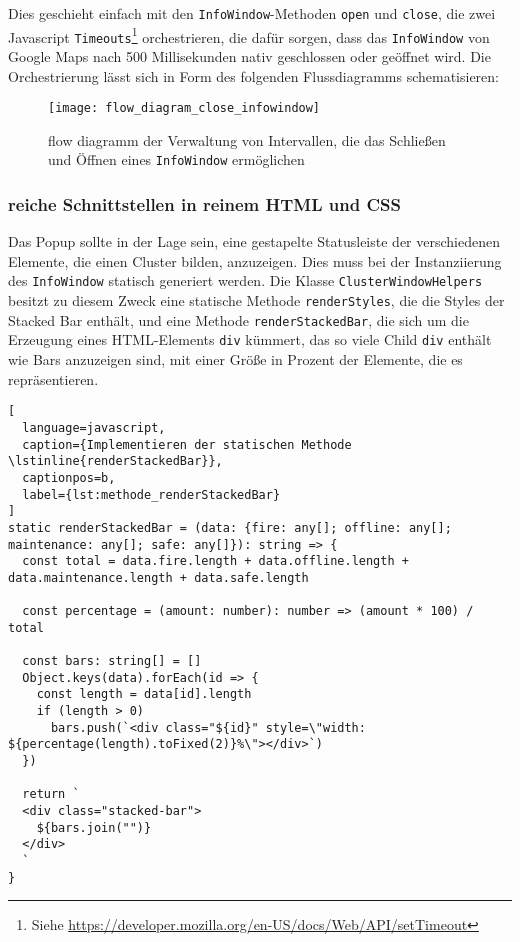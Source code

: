 Dies geschieht einfach mit den \lstinline{InfoWindow}-Methoden \lstinline{open} und \lstinline{close}, die zwei Javascript \lstinline{Timeouts}\footnote{Siehe \href{https://developer.mozilla.org/en-US/docs/Web/API/setTimeout}{https://developer.mozilla.org/en-US/docs/Web/API/setTimeout}} orchestrieren, die dafür sorgen, dass das \lstinline{InfoWindow} von Google Maps nach 500 Millisekunden nativ geschlossen oder geöffnet wird.
Die Orchestrierung lässt sich in Form des folgenden Flussdiagramms schematisieren:

\begin{figure}[H]
  \centering
  \texttt{[image: flow\_diagram\_close\_infowindow]}
  \caption{flow diagramm der Verwaltung von Intervallen, die das Schließen und Öffnen eines \lstinline{InfoWindow} ermöglichen}
  \label{fig:flow_diagram_close_infowindow}
\end{figure}

\subsubsection{reiche Schnittstellen in reinem \ac{HTML} und \ac{CSS}}

Das Popup sollte in der Lage sein, eine gestapelte Statusleiste der verschiedenen Elemente, die einen Cluster bilden, anzuzeigen.
Dies muss bei der Instanziierung des \lstinline{InfoWindow} statisch generiert werden.
Die Klasse \lstinline{ClusterWindowHelpers} besitzt zu diesem Zweck eine statische Methode \lstinline{renderStyles}, die die Styles der Stacked Bar enthält, und eine Methode \lstinline{renderStackedBar}, die sich um die Erzeugung eines HTML-Elements \lstinline{div} kümmert, das so viele Child \lstinline{div} enthält wie Bars anzuzeigen sind, mit einer Größe in Prozent der Elemente, die es repräsentieren.

\begin{lstlisting}[
  language=javascript,
  caption={Implementieren der statischen Methode \lstinline{renderStackedBar}},
  captionpos=b,
  label={lst:methode_renderStackedBar}
]
static renderStackedBar = (data: {fire: any[]; offline: any[]; maintenance: any[]; safe: any[]}): string => {
  const total = data.fire.length + data.offline.length + data.maintenance.length + data.safe.length

  const percentage = (amount: number): number => (amount * 100) / total

  const bars: string[] = []
  Object.keys(data).forEach(id => {
    const length = data[id].length
    if (length > 0)
      bars.push(`<div class="${id}" style=\"width: ${percentage(length).toFixed(2)}%\"></div>`)
  })

  return `
  <div class="stacked-bar">
    ${bars.join("")}
  </div>
  `
}
\end{lstlisting}

